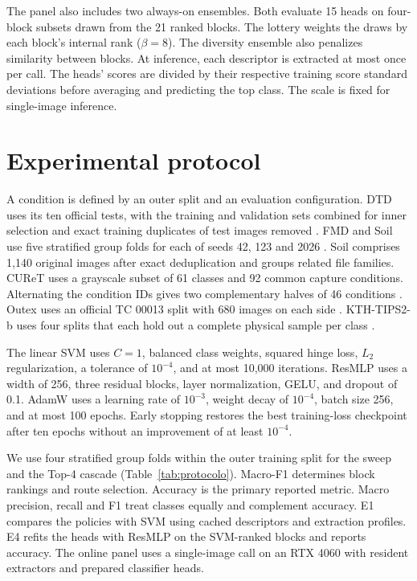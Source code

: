 \documentclass[10pt,a4paper,fleqn]{article}
\begin{document}
The panel also includes two always-on ensembles. Both evaluate 15 heads on four-block subsets drawn from the 21 ranked blocks. The lottery weights the draws by each block's internal rank ($\beta=8$). The diversity ensemble also penalizes similarity between blocks. At inference, each descriptor is extracted at most once per call. The heads' scores are divided by their respective training score standard deviations before averaging and predicting the top class. The scale is fixed for single-image inference.

\section{Experimental protocol}

A condition is defined by an outer split and an evaluation configuration. DTD uses its ten official tests, with the training and validation sets combined for inner selection and exact training duplicates of test images removed \citep{cimpoi2014dtd}. FMD and Soil use five stratified group folds for each of seeds 42, 123 and 2026 \citep{sharan2013fmd}. Soil comprises 1,140 original images after exact deduplication and groups related file families. CUReT uses a grayscale subset of 61 classes and 92 common capture conditions. Alternating the condition IDs gives two complementary halves of 46 conditions \citep{varma2003filter}. Outex uses an official TC 00013 split with 680 images on each side \citep{ojala2002outex}. KTH-TIPS2-b uses four splits that each hold out a complete physical sample per class \citep{mallikarjuna2005kth,scabini2023radam}.

The linear SVM uses $C=1$, balanced class weights, squared hinge loss, $L_2$ regularization, a tolerance of $10^{-4}$, and at most 10,000 iterations. ResMLP uses a width of 256, three residual blocks, layer normalization, GELU, and dropout of 0.1. AdamW uses a learning rate of $10^{-3}$, weight decay of $10^{-4}$, batch size 256, and at most 100 epochs. Early stopping restores the best training-loss checkpoint after ten epochs without an improvement of at least $10^{-4}$.

We use four stratified group folds within the outer training split for the sweep and the Top-4 cascade (Table~\ref{tab:protocolo}). Macro-F1 determines block rankings and route selection. Accuracy is the primary reported metric. Macro precision, recall and F1 treat classes equally and complement accuracy. E1 compares the policies with SVM using cached descriptors and extraction profiles. E4 refits the heads with ResMLP on the SVM-ranked blocks and reports accuracy. The online panel uses a single-image call on an RTX 4060 with resident extractors and prepared classifier heads.
\end{document}
